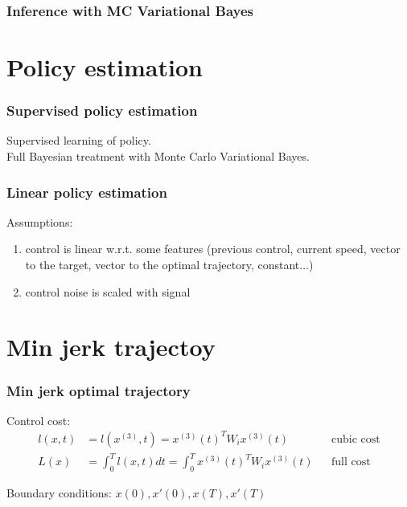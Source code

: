\documentclass[xcolor=svgnames,table]{beamer}
\begin{document}
\begin{frame}
\frametitle{Inference with MC Variational Bayes}

\begin{algorithm}[H]
\end{algorithm}
\end{frame}

\section{Policy estimation}



\begin{frame}
\frametitle{Supervised policy estimation}
\begin{center}
\scalebox{0.5}{
  
}
\end{center}
Supervised learning of policy.\\
Full Bayesian treatment with Monte Carlo Variational Bayes.
\end{frame}

\begin{frame}
\frametitle{Linear policy estimation}
Assumptions:
\begin{enumerate}
  \item control is linear w.r.t. some features (previous control, current speed, vector to the target, vector to the optimal trajectory, constant...)
  \item control noise is scaled with signal
\end{enumerate}

\end{frame}

\section{Min jerk trajectoy}

\begin{frame}
\frametitle{Min jerk optimal trajectory}
Control cost:
\begin{align}
l(x, t) &= l(x^{(3)}, t) = x^{(3)}(t)^T W_i x^{(3)}(t) &&\text{cubic cost} \\
L(x) 	&= \int_0^T  l(x, t) dt = \int_0^T x^{(3)}(t)^T W_i x^{(3)}(t) &&\text{full cost} 
\end{align}

Boundary conditions: $x(0), x'(0), x(T), x'(T)$

\end{frame}
\end{document}

